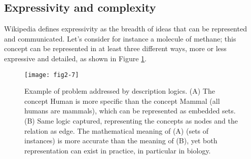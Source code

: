 \subsection{Expressivity and complexity}
\label{complexity}

Wikipedia defines expressivity as the breadth of ideas that can be represented and communicated. Let's consider for instance a molecule of methane; this concept can be represented in at least three different ways, more or less expressive and detailed, as shown in Figure \ref{fig2-7}.

\begin{figure}[ht]
    \centering
    \texttt{[image: fig2-7]}
    \caption{Example of problem addressed by description logics. (A) The concept Human is more specific than the concept Mammal (all humans are mammals), which can be represented as embedded sets. (B) Same logic captured, representing the concepts as nodes and the relation as edge. The mathematical meaning of (A) (sets of instances) is more accurate than the meaning of (B), yet both representation can exist in practice, in particular in biology.}
    \label{fig2-7}
\end{figure}

